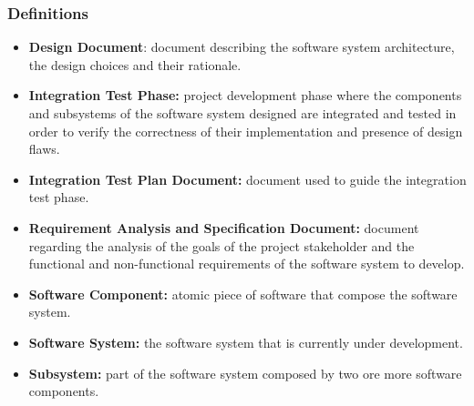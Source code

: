 \subsubsection{Definitions}

\begin{itemize}
	\item \textbf{Design Document}: document describing the software system architecture, the design choices and their rationale.
	\item \textbf{Integration Test Phase:} project development phase where the components and subsystems of the software system designed are integrated and tested in order to verify the correctness of their implementation and presence of design flaws.
	\item \textbf{Integration Test Plan Document:} document used to guide the integration test phase.
	\item \textbf{Requirement Analysis and Specification Document:} document regarding the analysis of the goals of the project stakeholder and the functional and non-functional requirements of the software system to develop.
	\item \textbf{Software Component:} atomic piece of software that compose the software system.
	\item \textbf{Software System:} the software system that is currently under development.
	\item \textbf{Subsystem:} part of the software system composed by two ore more software components.
\end{itemize}
